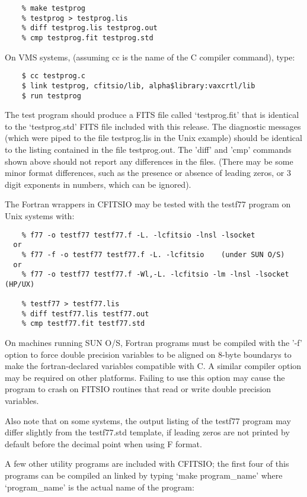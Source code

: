 \documentclass[11pt]{book}
\begin{document}
\begin{verbatim}
    % make testprog
    % testprog > testprog.lis
    % diff testprog.lis testprog.out
    % cmp testprog.fit testprog.std
\end{verbatim}
 On VMS systems,
(assuming cc is the name of the C compiler command), type:

\begin{verbatim}
    $ cc testprog.c
    $ link testprog, cfitsio/lib, alpha$library:vaxcrtl/lib
    $ run testprog
\end{verbatim}
The test program should produce a FITS file called `testprog.fit'
that is identical to the `testprog.std' FITS file included with this
release.  The diagnostic messages (which were piped to the file
testprog.lis in the Unix example) should be identical to the listing
contained in the file testprog.out.  The 'diff' and 'cmp' commands
shown above should not report any differences in the files.  (There
may be some minor format differences, such as the presence or
absence of leading zeros, or 3 digit exponents in numbers,
which can be ignored).

The Fortran wrappers in CFITSIO may be tested with the testf77
program on Unix systems with:

\begin{verbatim}
    % f77 -o testf77 testf77.f -L. -lcfitsio -lnsl -lsocket
  or
    % f77 -f -o testf77 testf77.f -L. -lcfitsio    (under SUN O/S)
  or
    % f77 -o testf77 testf77.f -Wl,-L. -lcfitsio -lm -lnsl -lsocket (HP/UX)

    % testf77 > testf77.lis
    % diff testf77.lis testf77.out
    % cmp testf77.fit testf77.std
\end{verbatim}
On machines running SUN O/S, Fortran programs must be compiled with the
'-f' option to force double precision variables to be aligned on 8-byte
boundarys to make the fortran-declared variables compatible with C.  A
similar compiler option may be required on other platforms.  Failing to
use this option may cause the program to crash on FITSIO routines that
read or write double precision variables.

Also note that on some systems, the output listing of the testf77
program may differ slightly from the testf77.std template, if leading
zeros are not printed by default before the decimal point when using F
format.

A few other utility programs are included with CFITSIO; the first four
of this programs can be compiled an linked by typing `make
program\_name' where `program\_name' is the actual name of the program:
\end{document}
